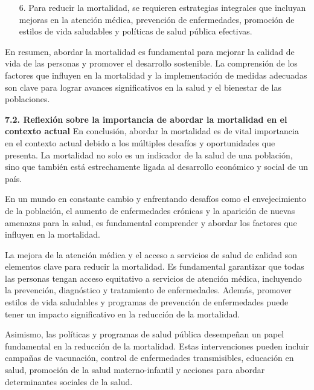 \documentclass[8pt,a4paper]{beamer}
\begin{document}
{\begin{frame}{}
\begin{block}{}
\begin{enumerate}
\item[6.] Para reducir la mortalidad, se requieren estrategias integrales que incluyan mejoras en la atención médica, prevención de enfermedades, promoción de estilos de vida saludables y políticas de salud pública efectivas.
\end{enumerate}
En resumen, abordar la mortalidad es fundamental para mejorar la calidad de vida de las personas y promover el desarrollo sostenible. La comprensión de los factores que influyen en la mortalidad y la implementación de medidas adecuadas son clave para lograr avances significativos en la salud y el bienestar de las poblaciones.
\end{block}
\end{frame}

\begin{frame}{}
\begin{block}{\textbf{7.2. Reflexión sobre la importancia de abordar la mortalidad en el contexto actual}}
\setlength{\parskip}{3px}
\justifying
En conclusión, abordar la mortalidad es de vital importancia en el contexto actual debido a los múltiples desafíos y oportunidades que presenta. La mortalidad no solo es un indicador de la salud de una población, sino que también está estrechamente ligada al desarrollo económico y social de un país.

En un mundo en constante cambio y enfrentando desafíos como el envejecimiento de la población, el aumento de enfermedades crónicas y la aparición de nuevas amenazas para la salud, es fundamental comprender y abordar los factores que influyen en la mortalidad.

La mejora de la atención médica y el acceso a servicios de salud de calidad son elementos clave para reducir la mortalidad. Es fundamental garantizar que todas las personas tengan acceso equitativo a servicios de atención médica, incluyendo la prevención, diagnóstico y tratamiento de enfermedades. Además, promover estilos de vida saludables y programas de prevención de enfermedades puede tener un impacto significativo en la reducción de la mortalidad.

\end{block}
\end{frame}


\begin{frame}{}
\begin{block}{}
\setlength{\parskip}{3px}
\justifying
Asimismo, las políticas y programas de salud pública desempeñan un papel fundamental en la reducción de la mortalidad. Estas intervenciones pueden incluir campañas de vacunación, control de enfermedades transmisibles, educación en salud, promoción de la salud materno-infantil y acciones para abordar determinantes sociales de la salud.


\end{block}
\end{frame}}
\end{document}
